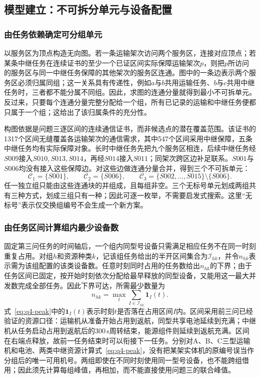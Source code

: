 \subsection{模型建立：不可拆分单元与设备配置}
\subsubsection{由任务依赖确定可分组单元}
以服务区为顶点构造无向图。若一条运输架次访问两个服务区，连接对应顶点；若某条中继任务在连续证书的至少一个已证区间实际保障运输架次$p$，则把$p$所访问的服务区与同一中继任务保障的其他架次的服务区连通。图中的一条边表示两个服务区必须归属同组；这一关系具有传递性，例如$a$与$b$共用运输任务、$b$与$c$共用中继任务时，三者都不能分属不同组。因此，求图的连通分量就得到最小不可拆单元。反过来，只要每个连通分量完整分配给一个组，所有已记录的运输和中继任务便都只属于一个组；这给出了该归属条件的充分性。

构图依据是问题三逐区间的连续通信证书，而非候选点的潜在覆盖范围。该证书的1317个区间无缝覆盖各运输架次的通信需求，其中547个区间采用中继保障，五条中继任务均有实际保障对象。长时中继任务先把九个服务区相连，后续中继任务经$S009$接入$S010,S013,S014$，再经$S014$接入$S011$；同架次跨区边补足联系。$S001$与$S006$均没有接入这些保障边。对这些边做连通分量合并，得到三个不可拆单元：
\begin{equation}
\mathcal C_1=\{S001\},\qquad
\mathcal C_2=\{S006\},\qquad
\mathcal C_3=\{S002,\ldots,S015\}\setminus\{S006\}.
\label{eq:q4-components}
\end{equation}
任一独立组只能由这些连通块的并组成，且每组非空。三个无标号单元划成两组共有三种方式，划成三组只有一种；因此可逐一枚举，不需要启发式搜索。这里“无标号”表示仅交换组编号不会生成一个新方案。

\subsubsection{由任务区间计算组内最少设备数}
固定第三问任务的时间轴后，一个组内同型号设备只需满足相应任务不在同一时刻重复占用。对组$h$和资源种类$k$，记该组任务给出的半开区间集合为$\mathcal I_{hk}$，并令$n_{hk}$表示需为该组配置的该类设备数。任意时刻同时占用的任务数给出$n_{hk}$的下界；由于任务区间已固定，按开始时刻依次分配给最早释放的同型设备，又能用这一最大并发数完成全部任务。因此下界可达，所需最少数量为
\begin{equation}
n_{hk}=\max_t\sum_{I\in\mathcal I_{hk}}\mathbf 1_I(t).
\label{eq:q4-peak}
\end{equation}
式~\eqref{eq:q4-peak}中的$\mathbf 1_I(t)$表示时刻$t$是否落在占用区间$I$内。区间采用前三问已经验证的资源口径：运输机从准备开始占用到返航，同型共享电池延续到充满；中继机从任务启动占用到返航后的300\,s周转结束，能源组件则延续到返航充满。区间在右端点释放，故前一任务结束时可以衔接下一任务。分别对A、B、C三型运输机和电池、两类中继资源计算式~\eqref{eq:q4-peak}，没有把某架实体机的原编号误当作分组后的唯一可用机号。两组即使在不同时刻使用同一型号设备，也不能跨组借用；因此须先计算每组峰值，再相加，而不能直接使用问题三的联合峰值。

